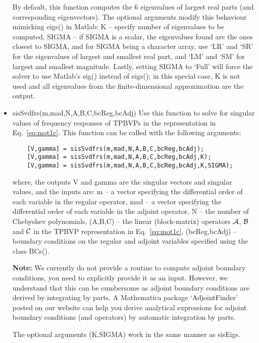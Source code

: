 \documentclass[%
secnumarabic,%
 amssymb, amsmath,%
 aps,prf,superscriptaddress,longbibliography
frontmatterverbose,
]{revtex4-2}
\begin{document}
\begin{itemize}
  By default, this function computes the 6 eigenvalues of largest real parts (and corresponding eigenvectors). The optional arguments modify this behaviour mimicking eigs() in Matlab: {\sf K} -- specify number of eigenvalues to be computed, {\sf SIGMA} -- if {\sf SIGMA} is a scalar, the eigenvalues 
  found are the ones closest to {\sf SIGMA}, and for {\sf SIGMA} being a character array, use `LR' and `SR' for the eigenvalues of largest and smallest
  real part, and `LM' and `SM' for largest and smallest magnitude.
  Lastly, setting {\sf SIGMA} to `Full' will force the solver to use Matlab's {\sf eig()} instead of {\sf eigs()}; in this special case,
  {\sf K} is not used and all eigenvalues from the finite-dimensional 
  approximation are the output.
  \item {\sf sisSvdfrs(m,mad,N,A,B,C,bcReg,bcAdj)} Use this function to solve for singular values of frequency responses of TPBVPs in the representation in Eq.~\eqref{eq:mot1c}. This function can be called with the following arguments:
  \begin{lstlisting}
    [V,gamma] = sisSvdfrs(m,mad,N,A,B,C,bcReg,bcAdj);
    [V,gamma] = sisSvdfrs(m,mad,N,A,B,C,bcReg,bcAdj,K);
    [V,gamma] = sisSvdfrs(m,mad,N,A,B,C,bcReg,bcAdj,K,SIGMA);
  \end{lstlisting}
  where, the outputs {\sf V} and {\sf gamma} are the singular vectors and singular values, and the inputs are: {\sf m} -- a vector specifying the differential order of each variable in the
  regular operator, {\sf mad} -- a vector specifying the differential order of each variable in the
  adjoint operator, {\sf N} -- the number of Chebyshev polynomials, {\sf (A,B,C)} -- the linear (block-matrix) operators $\mathcal{A}$, $\mathcal{B}$ and $\mathcal{C}$ in the TPBVP representation in Eq.~\eqref{eq:mot1c}, {\sf (bcReg,bcAdj)} -- boundary conditions on the regular and adjoint variables specified using the class BCs(). 
  
  \textbf{Note:} We currently do not provide a routine to compute adjoint boundary conditions, you need to explicitly provide it as an input. However, we understand that this can be cumbersome as adjoint boundary conditions are derived by integrating by parts. A Mathematica package `AdjointFinder' posted on our website can help you derive analytical expressions for adjoint boundary conditions (and operators) by automatic integration by parts.   

  The optional arguments {\sf (K,SIGMA)} work in the same manner as {\sf sisEigs}. 
\end{itemize} 
\end{document}
